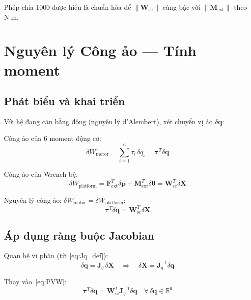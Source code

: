\documentclass[12pt,a4paper]{article}
\newcommand{\pp}{\mathbf{p}}
\newcommand{\Jq}{\mathbf{J}_q}
\newcommand{\tauv}{\boldsymbol{\tau}}
\newcommand{\Wsc}{\mathbf{W}_{\mathrm{sc}}}
\newcommand{\Fv}{\mathbf{F}}
\newcommand{\Mv}{\mathbf{M}}
\begin{document}
Phép chia 1000 được hiểu là chuẩn hóa để $\|\Wsc\|$ cùng bậc với $\|\Mv_{\text{ext}}\|$ theo N$\cdot$m.

\section{Nguyên lý Công ảo --- Tính moment}

\subsection{Phát biểu và khai triển}

Với hệ đang cân bằng động (nguyên lý d'Alembert), xét chuyển vị ảo $\delta\mathbf{q}$:

Công ảo của 6 moment động cơ:
\begin{equation}
  \delta W_{\text{motor}} = \sum_{i=1}^{6}\tau_i\,\delta q_i = \tauv^T\delta\mathbf{q}
  \label{eq:dW_motor}
\end{equation}

Công ảo của Wrench bệ:
\begin{equation}
  \delta W_{\text{platform}} = \Fv_{\text{ext}}^T\delta\pp + \Mv_{\text{ext}}^T\delta\boldsymbol{\theta}
  = \Wsc^T\delta\mathbf{X}
  \label{eq:dW_plat}
\end{equation}

Nguyên lý công ảo: $\delta W_{\text{motor}} = \delta W_{\text{platform}}$:
\begin{equation}
  \tauv^T\delta\mathbf{q} = \Wsc^T\delta\mathbf{X}
  \label{eq:PVW}
\end{equation}

\subsection{Áp dụng ràng buộc Jacobian}

Quan hệ vi phân (từ~\eqref{eq:Jq_def}):
\begin{equation}
  \delta\mathbf{q} = \Jq\,\delta\mathbf{X}
  \quad\Rightarrow\quad
  \delta\mathbf{X} = \Jq^{-1}\delta\mathbf{q}
\end{equation}

Thay vào~\eqref{eq:PVW}:
\begin{equation}
  \tauv^T\delta\mathbf{q} = \Wsc^T\Jq^{-1}\delta\mathbf{q}
  \quad \forall\,\delta\mathbf{q}\in\mathbb{R}^6
\end{equation}
\end{document}
